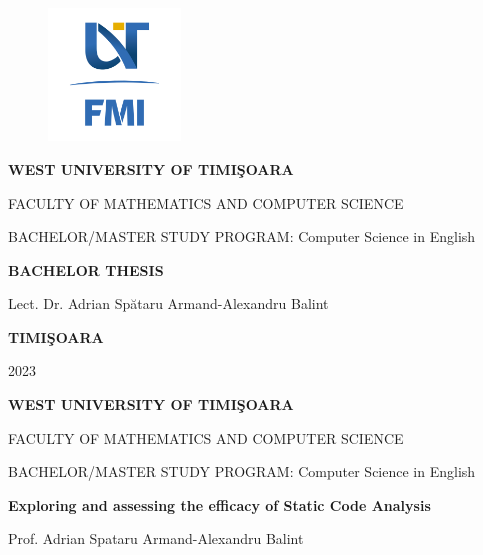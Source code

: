 \documentclass[12pt,a4paper,openany]{book}
\theoremstyle{definition}
\theoremstyle{remark}
\begin{document}
\sloppy

\thispagestyle{empty}
\begin{center}
\begin{figure}[h!]
\vspace{-20pt}
\begin{center}
\includegraphics[width=100pt]{FMI-03.png}
\end{center}
\end{figure}


{\large{\bf WEST UNIVERSITY OF TIMI\c SOARA

FACULTY OF MATHEMATICS AND COMPUTER SCIENCE

BACHELOR/MASTER STUDY PROGRAM:  Computer Science in English}}

\vspace{120pt}
{\huge {\bf BACHELOR THESIS}}

\vspace{160pt}
\end{center}

{\large{}

\noindent Lect. Dr. Adrian Spătaru \hfill 
\noindent  Armand-Alexandru Balint
}

\vfill
\begin{center}
{\bf TIMI\c SOARA

2023}
\end{center}
\newpage
\thispagestyle{empty}
\begin{center}
{\large{\bf WEST UNIVERSITY OF TIMI\c SOARA
		
FACULTY OF MATHEMATICS AND COMPUTER SCIENCE
		
BACHELOR/MASTER STUDY PROGRAM:  Computer Science in English}}

\vspace{200pt}
{\huge {\bf Exploring and assessing the efficacy of Static Code Analysis }}
\vspace{153pt}
\end{center}

{\large{}

\noindent Prof. Adrian Spataru\hfill
\noindent Armand-Alexandru Balint}
 
\end{document}
